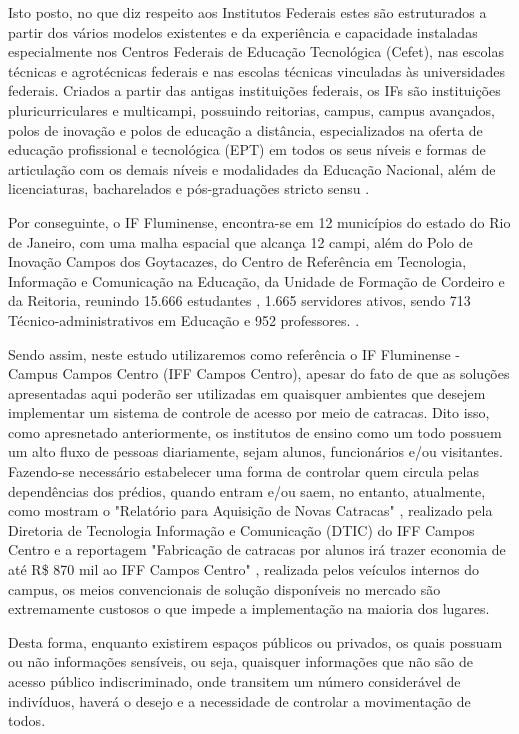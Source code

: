 Isto posto, no que diz respeito aos Institutos Federais estes são estruturados a partir dos vários modelos existentes e da experiência e capacidade instaladas especialmente nos Centros Federais de Educação Tecnológica (Cefet), nas escolas técnicas e agrotécnicas federais e nas escolas técnicas vinculadas às universidades federais. Criados a partir das antigas instituições federais, os IFs são instituições pluricurriculares e multicampi, possuindo reitorias, campus, campus avançados, polos de inovação e polos de educação a distância, especializados na oferta de educação profissional e tecnológica (EPT) em todos os seus níveis e formas de articulação com os demais níveis e modalidades da Educação Nacional, além de licenciaturas, bacharelados e pós-graduações stricto sensu \cite{institutofederal}.



Por conseguinte, o IF Fluminense, encontra-se em 12 municípios do estado do Rio de Janeiro, com uma malha espacial que alcança 12 campi, além do Polo de Inovação Campos dos Goytacazes, do Centro de Referência em Tecnologia, Informação e Comunicação na Educação, da Unidade de Formação de Cordeiro e da Reitoria, reunindo 15.666 estudantes \cite{iffemnumeros}, 1.665 servidores ativos, sendo 713 Técnico-administrativos em Educação e 952 professores. \cite{iffluminense}. 


Sendo assim, neste estudo utilizaremos como referência o IF Fluminense - Campus Campos Centro (IFF Campos Centro), apesar do fato de que as soluções apresentadas aqui poderão ser utilizadas em quaisquer ambientes que desejem implementar um sistema de controle de acesso por meio de catracas. Dito isso, como apresnetado anteriormente, os institutos de ensino como um todo possuem um alto fluxo de pessoas
diariamente, sejam alunos, funcionários e/ou visitantes. Fazendo-se necessário
estabelecer uma forma de controlar quem circula pelas dependências dos prédios, quando
entram e/ou saem, no entanto, atualmente, como mostram o "Relatório para Aquisição de Novas Catracas" \cite{relatorio},  realizado pela Diretoria de
Tecnologia Informação e Comunicação (DTIC) do IFF Campos Centro e a reportagem "Fabricação de catracas por alunos irá trazer economia de até R\$ 870 mil ao IFF Campos Centro" \cite{reportagem}, realizada pelos veículos internos do campus,  os meios convencionais de solução disponíveis
no mercado são extremamente custosos o que impede a implementação na maioria dos lugares.



Desta forma, enquanto existirem espaços públicos ou privados, os quais possuam ou não
informações sensíveis, ou seja, quaisquer informações que não são de acesso público indiscriminado, onde transitem um número considerável de indivíduos, haverá o
desejo e a necessidade de controlar a movimentação de todos.


